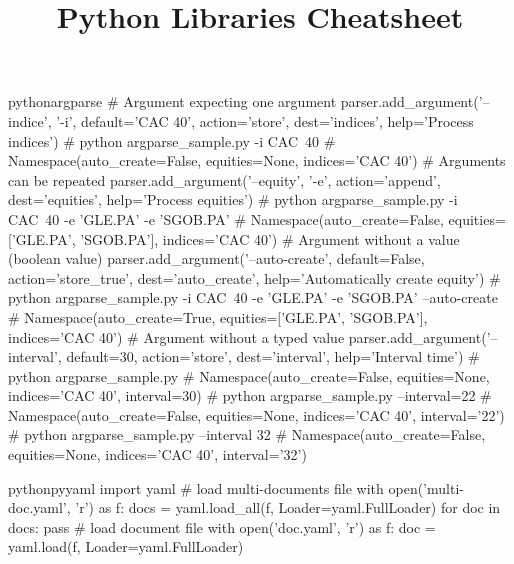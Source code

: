 \documentclass[10pt,a4paper]{article}
\title{\color{w3schools}Python Libraries Cheatsheet
}
\begin{document}
\maketitle

\small
\begin{multicols}{3}

\thispagestyle{empty}
\scriptsize



\begin{codebox}{python}{argparse}
    # Argument expecting one argument
    parser.add_argument('--indice', '-i', default='CAC 40', action='store', dest='indices', help='Process indices')
    # python argparse_sample.py -i CAC\ 40
    # Namespace(auto_create=False, equities=None, indices='CAC 40')
    # Arguments can be repeated
    parser.add_argument('--equity', '-e', action='append', dest='equities', help='Process equities')
    # python argparse_sample.py -i CAC\ 40 -e 'GLE.PA' -e 'SGOB.PA'
    # Namespace(auto_create=False, equities=['GLE.PA', 'SGOB.PA'], indices='CAC 40')
    # Argument without a value (boolean value)
    parser.add_argument('--auto-create', default=False, action='store_true', dest='auto_create', help='Automatically create equity')
    # python argparse_sample.py -i CAC\ 40 -e 'GLE.PA' -e 'SGOB.PA' --auto-create
    # Namespace(auto_create=True, equities=['GLE.PA', 'SGOB.PA'], indices='CAC 40')
    # Argument without a typed value
    parser.add_argument('--interval', default=30, action='store', dest='interval', help='Interval time')
    # python argparse_sample.py
    # Namespace(auto_create=False, equities=None, indices='CAC 40', interval=30)
    # python argparse_sample.py --interval=22
    # Namespace(auto_create=False, equities=None, indices='CAC 40', interval='22')
    # python argparse_sample.py --interval 32
    # Namespace(auto_create=False, equities=None, indices='CAC 40', interval='32')

\end{codebox}

\begin{codebox}{python}{pyyaml}
    import yaml
    # load multi-documents file
    with open('multi-doc.yaml', 'r') as f:
    docs = yaml.load_all(f, Loader=yaml.FullLoader)
    for doc in docs:
      pass
    # load document file
    with open('doc.yaml', 'r') as f:
    doc = yaml.load(f, Loader=yaml.FullLoader)

\end{codebox}


\AtNextBibliography{\footnotesize}
\printbibliography  
\end{multicols}
\end{document}

